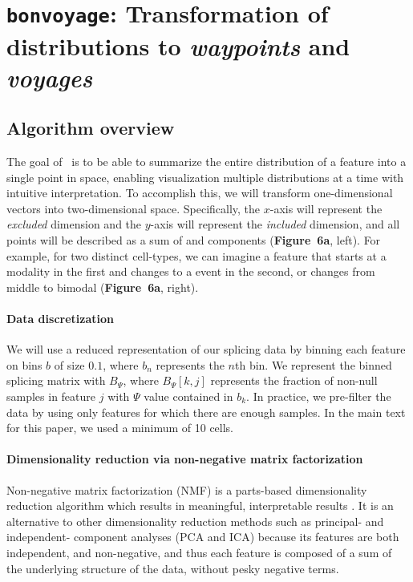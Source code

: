 \section{\texttt{bonvoyage}: Transformation of distributions to \emph{waypoints} and \emph{voyages}}
\label{sec:bonvoyage}

\subsection{Algorithm overview}

The goal of \bonvoyage\, is to be able to summarize the entire distribution of a feature into a single point in space, enabling visualization multiple distributions at a time with intuitive interpretation. To accomplish this, we will transform one-dimensional vectors into two-dimensional space. Specifically, the $x$-axis will represent the \emph{excluded} dimension and the $y$-axis will represent the \emph{included} dimension, and all points will be described as a sum of \0 and \1 components (\textbf{Figure~6a}, left). For example, for two distinct cell-types, we can imagine a feature that starts at a \1 modality in the first and changes to a \0 event in the second, or changes from middle to bimodal (\textbf{Figure~6a}, right). 



\paragraph{Data discretization}
We will use a reduced representation of our splicing data by binning each feature on bins $b$ of size $0.1$, where $b_n$ represents the $n$th bin. We represent the binned splicing matrix with $B_\Psi$, where $B_\Psi[k,j]$ represents the fraction of non-null samples in feature $j$ with $\Psi$ value contained in $b_k$. In practice, we pre-filter the data by using only features for which there are enough samples. In the main text for this paper, we used a minimum of 10 cells.

\paragraph{Dimensionality reduction via non-negative matrix factorization}

Non-negative matrix factorization (NMF) is a parts-based dimensionality reduction algorithm which results in meaningful, interpretable results \cite{Lee:1999gw}. It is an alternative to other dimensionality reduction methods such as principal- and independent- component analyses (PCA and ICA) because its features are both independent, and non-negative, and thus each feature is composed of a sum of the underlying structure of the data, without pesky negative terms.

